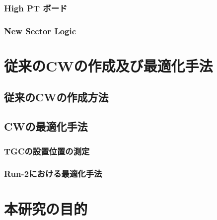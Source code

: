 \subsubsection{High PT ボード}

\subsubsection{New Sector Logic}

\section{従来のCWの作成及び最適化手法}\label{section:最適化}
\subsection{従来のCWの作成方法}

\subsection{CWの最適化手法}
\subsubsection{TGCの設置位置の測定}\label{ズレ}


\subsubsection{Run-2における最適化手法}

\section{本研究の目的}